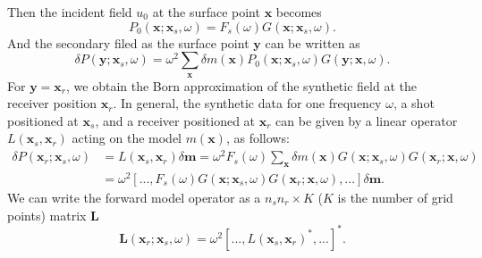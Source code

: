 \documentclass[11pt,titlepage]{article}
\newcommand{\bx}{\boldsymbol{x}}
\newcommand{\by}{\boldsymbol{y}}
\newcommand{\bL}{\boldsymbol{L}}
\newcommand{\bm}{\boldsymbol{m}}
\theoremstyle{plain}
\theoremstyle{definition}
\theoremstyle{remark}
\numberwithin{equation}{section}
\begin{document}
Then the incident field $u_0$ at the surface point $\bx$ becomes
\begin{equation}
P_0(\bx; \bx_s,\omega)=F_s(\omega)G(\bx; \bx_s,\omega).
\end{equation}
And the secondary filed as the surface point $\by$ can be written as 
\begin{equation}
\delta P(\by; \bx_s,\omega)=\omega^2 \sum_{\bx}  \delta m(\bx) P_0(\bx;\bx_s,\omega) G(\by;\bx,\omega).
\end{equation}
For $\by=\bx_r$, we obtain the Born approximation of the synthetic field at the receiver position $\bx_r$. In general, the synthetic data for one frequency $\omega$, a shot positioned at $\bx_s$, and a receiver positioned at $\bx_r$ can be given by a linear operator $L(\bx_s,\bx_r)$ acting on the model $m(\bx)$, as follows:
\begin{align}
\delta P(\bx_r;\bx_s, \omega)&=L(\bx_s,\bx_r)\delta \bm=\omega^2 F_s(\omega)\sum_{\bx}\delta m(\bx)G(\bx;\bx_s,\omega)G(\bx_r;\bx,\omega)\nonumber\\
&=\omega^2 [...,F_s(\omega)G(\bx;\bx_s,\omega)G(\bx_r;\bx,\omega),...]\delta \bm.
\end{align} 
We can write the forward model operator as a $n_s n_r\times K$ ($K$ is the number of grid points) matrix $\bL$
\begin{equation}
\label{eq:operatorL}
\bL(\bx_r;\bx_s,\omega) = \omega^2 [...,L(\bx_s,\bx_r)^*,...]^*.
\end{equation}
\end{document}
